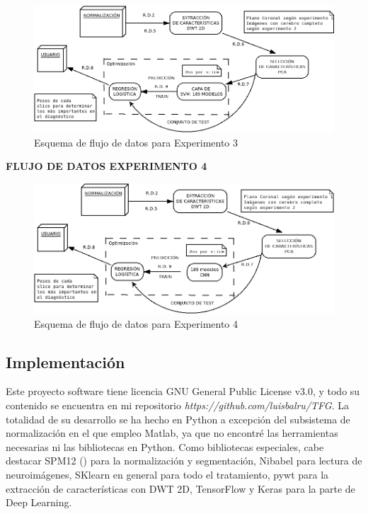 \begin{figure}[H] %
	\centering
	\includegraphics[scale=0.45]{fdexp3.png}  %
	\caption{Esquema de flujo de datos para Experimento 3} 
	\label{fig:fdexp3}
\end{figure}
\newpage
\textbf{FLUJO DE DATOS EXPERIMENTO 4}
\vspace{0.5cm}

\begin{figure}[H] %
	\centering
	\includegraphics[scale=0.45]{fdexp4.png}  %
	\caption{Esquema de flujo de datos para Experimento 4} 
	\label{fig:fdexp4}
\end{figure}

\subsection{Implementación}

Este proyecto software tiene licencia GNU General Public License v3.0, y todo su contenido se encuentra en mi repositorio \textit{https://github.com/luisbalru/TFG}. La totalidad de su desarrollo se ha hecho en Python a excepción del subsistema de normalización en el que empleo Matlab, ya que no encontré las herramientas necesarias ni las bibliotecas en Python. Como bibliotecas especiales, cabe destacar SPM12 (\cite{spm}) para la normalización y segmentación, Nibabel para lectura de neuroimágenes, SKlearn en general para todo el tratamiento, pywt para la extracción de características con DWT 2D, TensorFlow y Keras para la parte de Deep Learning. 
\newpage


